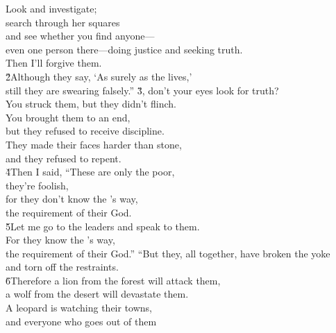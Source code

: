 \begin{poetry}
\poeml Look and investigate; \\
\poeml search through her squares \\
\poemll    and see whether you find anyone--- \\
\poeml even one person there---doing justice and seeking truth. \\
\poemll    Then I'll forgive them. \\
\poeml \v{2}Although they say, `As surely as the  lives,' \\
\poemll    still they are swearing falsely.''
\poeml \v{3}, don't your eyes look for truth? \\
\poemll    You struck them, but they didn't flinch. \\
\poeml You brought them to an end, \\
\poemll    but they refused to receive discipline. \\
\poeml They made their faces harder than stone, \\
\poemll    and they refused to repent. \\
\poeml \v{4}Then I said, ``These are only the poor, \\
\poemll    they're foolish, \\
\poeml for they don't know the 's way, \\
\poemll    the requirement of their God. \\
\poeml \v{5}Let me go to the leaders and speak to them. \\
\poemll    For they know the 's way, \\
\poemlll       the requirement of their God.''
\poeml ``But they, all together, have broken the yoke \\
\poemll    and torn off the restraints. \\
\poeml \v{6}Therefore a lion from the forest will attack them, \\
\poemll    a wolf from the desert will devastate them. \\
\poeml A leopard is watching their towns, \\
\poemll    and everyone who goes out of them \\

\end{poetry}
